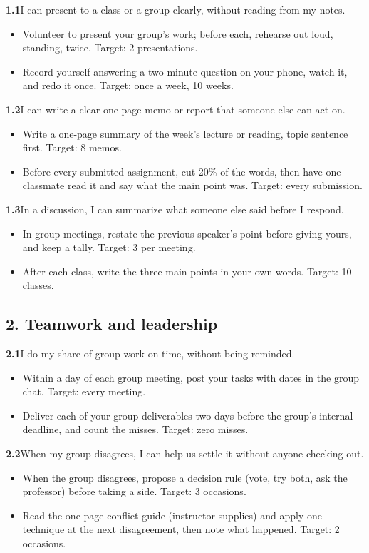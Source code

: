 \documentclass[11pt,letterpaper]{article}
\newcommand{\bx}{$\square$}
\newcommand{\itemhead}[2]{\par\vspace{6pt}\noindent\textbf{#1}\quad #2\par\vspace{-4pt}}
\newenvironment{practices}{\begin{itemize}[leftmargin=2.2em,itemsep=1pt,topsep=2pt,label=\bx]}{\end{itemize}}
\begin{document}
\itemhead{1.1}{I can present to a class or a group clearly, without reading from my notes.}
\begin{practices}
\item Volunteer to present your group's work; before each, rehearse out loud, standing, twice. Target: 2 presentations.
\item Record yourself answering a two-minute question on your phone, watch it, and redo it once. Target: once a week, 10 weeks.
\end{practices}

\itemhead{1.2}{I can write a clear one-page memo or report that someone else can act on.}
\begin{practices}
\item Write a one-page summary of the week's lecture or reading, topic sentence first. Target: 8 memos.
\item Before every submitted assignment, cut 20\% of the words, then have one classmate read it and say what the main point was. Target: every submission.
\end{practices}

\itemhead{1.3}{In a discussion, I can summarize what someone else said before I respond.}
\begin{practices}
\item In group meetings, restate the previous speaker's point before giving yours, and keep a tally. Target: 3 per meeting.
\item After each class, write the three main points in your own words. Target: 10 classes.
\end{practices}

\subsection*{2. Teamwork and leadership}

\itemhead{2.1}{I do my share of group work on time, without being reminded.}
\begin{practices}
\item Within a day of each group meeting, post your tasks with dates in the group chat. Target: every meeting.
\item Deliver each of your group deliverables two days before the group's internal deadline, and count the misses. Target: zero misses.
\end{practices}

\itemhead{2.2}{When my group disagrees, I can help us settle it without anyone checking out.}
\begin{practices}
\item When the group disagrees, propose a decision rule (vote, try both, ask the professor) before taking a side. Target: 3 occasions.
\item Read the one-page conflict guide (instructor supplies) and apply one technique at the next disagreement, then note what happened. Target: 2 occasions.
\end{practices}
\end{document}
